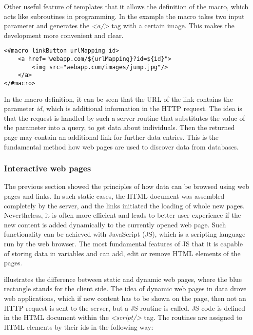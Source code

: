 Other useful feature of templates that it allows the definition of the macro, which acts like subroutines in programming. In the example the macro \textit{\@linkButton} takes two input parameter and generates the \textit{<a/>} tag with a certain image. This makes the development more convenient and clear.

\begin{lstlisting}[captionpos=b, caption=Macro definition, label=skullJSON, belowskip=1em, aboveskip=2em,
basicstyle=\footnotesize,frame=single]
<#macro linkButton urlMapping id>
	<a href="webapp.com/${urlMapping}?id=${id}">
		<img src="webapp.com/images/jump.jpg"/>
	</a>
</#macro>
\end{lstlisting}

In the macro definition, it can be seen that the URL of the link contains the parameter \textit{id}, which is additional information in the HTTP request. The idea is that the request is handled by such a server routine that substitutes the value of the parameter into a query, to get data about individuals. Then the returned page may contain an additional link for further data entries. This is the fundamental method how web pages are used to discover data from databases.

\subsubsection{Interactive web pages}

The previous section showed the principles of how data can be browsed using web pages and links. In such static cases, the HTML document was assembled completely by the server, and the links initiated the loading of whole new pages. Nevertheless, it is often more efficient and leads to better user experience if the new content is added dynamically to the currently opened web page. Such functionality can be achieved with JavaScript (JS), which is a scripting language run by the web browser. The most fundamental features of JS that it is capable of storing data in variables and can add, edit or remove HTML elements of the pages. 


 illustrates the difference between static and dynamic web pages, where the blue rectangle stands for the client side. The idea of dynamic web pages in data drove web applications, which if new content has to be shown on the page, then not an HTTP request is sent to the server, but a JS routine is called. JS code is defined in the HTML document within the \textit{<script/>} tag. The routines are assigned to HTML elements by their ids in the following way:

